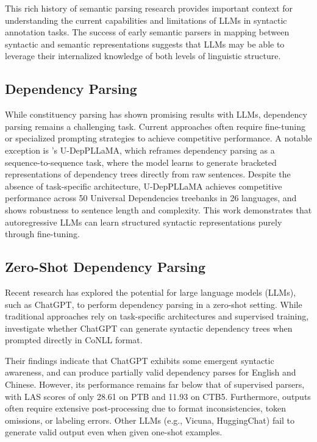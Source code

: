 This rich history of semantic parsing research provides important context for understanding the current capabilities and limitations of LLMs in syntactic annotation tasks. The success of early semantic parsers in mapping between syntactic and semantic representations suggests that LLMs may be able to leverage their internalized knowledge of both levels of linguistic structure.

\subsection{Dependency Parsing}

While constituency parsing has shown promising results with LLMs, dependency parsing remains a challenging task. Current approaches often require fine-tuning or specialized prompting strategies to achieve competitive performance. A notable exception is \citet{hromei2024udeppllama}'s U-DepPLLaMA, which reframes dependency parsing as a sequence-to-sequence task, where the model learns to generate bracketed representations of dependency trees directly from raw sentences. Despite the absence of task-specific architecture, U-DepPLLaMA achieves competitive performance across 50 Universal Dependencies treebanks in 26 languages, and shows robustness to sentence length and complexity. This work demonstrates that autoregressive LLMs can learn structured syntactic representations purely through fine-tuning.

\subsection{Zero-Shot Dependency Parsing}

Recent research has explored the potential for large language models (LLMs), such as ChatGPT, to perform dependency parsing in a zero-shot setting. While traditional approaches rely on task-specific architectures and supervised training, \citet{lin2023chatgpt} investigate whether ChatGPT can generate syntactic dependency trees when prompted directly in CoNLL format.

Their findings indicate that ChatGPT exhibits some emergent syntactic awareness, and can produce partially valid dependency parses for English and Chinese. However, its performance remains far below that of supervised parsers, with LAS scores of only 28.61 on PTB and 11.93 on CTB5. Furthermore, outputs often require extensive post-processing due to format inconsistencies, token omissions, or labeling errors. Other LLMs (e.g., Vicuna, HuggingChat) fail to generate valid output even when given one-shot examples.


